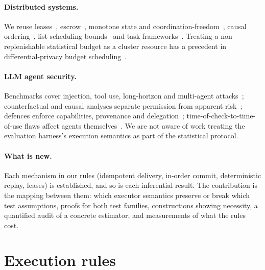 \documentclass[11pt]{article}
\theoremstyle{definition}
\begin{document}
\paragraph{Distributed systems.} We reuse leases~\cite{gray1989leases}, escrow~\cite{oneil1986escrow}, monotone state and coordination-freedom~\cite{shapiro2011crdt,hellerstein2020calm}, causal ordering~\cite{lamport1978,chandy1985}, list-scheduling bounds~\cite{graham1969} and task frameworks~\cite{moritz2018ray}. Treating a non-replenishable statistical budget as a cluster resource has a precedent in differential-privacy budget scheduling~\cite{luo2021privatekube}.

\paragraph{LLM agent security.} Benchmarks cover injection, tool use, long-horizon and multi-agent attacks~\cite{debenedetti2024agentdojo,zhan2024injecagent,jiang2026agentlab,tamas2025,darkside2025,mazeika2024harmbench}; counterfactual and causal analyses separate permission from apparent risk~\cite{yang2026agentboundary,mothukuri2026causaltrace}; defences enforce capabilities, provenance and delegation~\cite{debenedetti2025camel,south2025delegation,pang2019zanzibar,birgisson2014macaroons}; time-of-check-to-time-of-use flaws affect agents themselves~\cite{lilienthal2025toctou}. We are not aware of work treating the evaluation harness's execution semantics as part of the statistical protocol.

\paragraph{What is new.} Each mechanism in our rules (idempotent delivery, in-order commit, deterministic replay, leases) is established, and so is each inferential result. The contribution is the mapping between them: which executor semantics preserve or break which test assumptions, proofs for both test families, constructions showing necessity, a quantified audit of a concrete estimator, and measurements of what the rules cost.

\section{Execution rules}\label{sec:rules}
\end{document}
